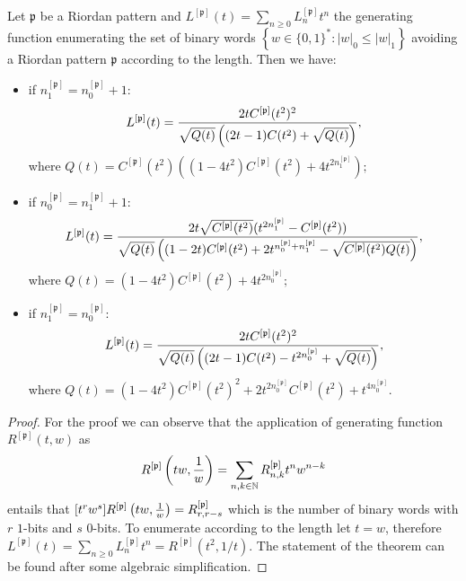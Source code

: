 \begin{teo}
\label{teo3}
Let $\mathfrak{p}$ be  a Riordan pattern and $L^{[\mathfrak{p}]}(t)=\sum_{n\geq
0}L_n^{[\mathfrak{p}]}t^n$ the generating function enumerating the set of binary words $\left\lbrace w\in
\lbrace 0,1 \rbrace^{*}: |w|_0\leq |w|_1\right\rbrace$ avoiding  a Riordan
pattern $\mathfrak{p}$ according to the length. Then we
have:
\begin{itemize}

\item if $n_1^{[\mathfrak{p}]}=n_0^{[\mathfrak{p}]}+1:$
$$L^{[\mathfrak{p}]}(t)= {2tC^{[\mathfrak{p}]}(t^2)^2 \over \sqrt{Q(t)}\left((2t-1)C(t^2)+ \sqrt{ Q(t) } \right)}, $$
where $Q(t)=C^{[\mathfrak{p}]}(t^2)\left( (1-4t^2)C^{[\mathfrak{p}]}(t^2)+4t^{2n_1^{[\mathfrak{p}]}}\right);$

\item if $n_0^{[\mathfrak{p}]}=n_1^{[\mathfrak{p}]}+1:$
$$L^{[\mathfrak{p}]}(t)={2t\sqrt{C^{[\mathfrak{p}]}(t^2)}(t^{2n_1^{[\mathfrak{p}]}}-C^{[\mathfrak{p}]}(t^2))
\over \sqrt{ Q(t) }\left((1-2t)C^{[\mathfrak{p}]}(t^2)+2t^{n_0^{[\mathfrak{p}]} +n_1^{[\mathfrak{p}]}}
- \sqrt{C^{[\mathfrak{p}]}(t^2) Q(t) } \right)}, $$
where $Q(t)=(1-4t^2)C^{[\mathfrak{p}]}(t^2)+4t^{2n_0^{[\mathfrak{p}]}};$

\item if $n_1^{[\mathfrak{p}]}=n_0^{[\mathfrak{p}]}:$ $$L^{[\mathfrak{p}]}(t)=
{2tC^{[\mathfrak{p}]}(t^2)^2 \over \sqrt{ Q(t)
}\left((2t-1)C(t^2)-t^{2n_0^{[\mathfrak{p}]}} + \sqrt{ Q(t) } \right)}, $$
where
$Q(t)=(1-4t^2)C^{[\mathfrak{p}]}(t^2)^2+2t^{2n_0^{[\mathfrak{p}]}}C^{[\mathfrak{p}]}(t^2)+t^{4n_0^{[\mathfrak{p}]}}.$

\end{itemize}
\end{teo}
\begin{proof}
For the proof we can observe that the application of generating function $R^{[\mathfrak{p}]}(t, w)$ as
\begin{displaymath}
 R^{[\mathfrak{p}]}\left(tw,{1 \over w}\right)=\sum_{n,k\in\mathbb{N}} R_{n, k}^{[\mathfrak{p}]}t^n w^{n-k}
\end{displaymath}
entails that $[t^{r}w^{s}]R^{[\mathfrak{p}]}\left(tw,{1 \over w}\right)=R_{r,
r-s}^{[\mathfrak{p}]}$ which is the number of binary words with $r$ $1$-bits
and $s$ $0$-bits.  To enumerate according to the length let $t=w$, therefore
$L^{[\mathfrak{p}]}(t)=\sum_{n\geq
0}L_n^{[\mathfrak{p}]}t^n=R^{[\mathfrak{p}]}(t^2,1/t)$. The statement of the
theorem can be found after some algebraic simplification.
\end{proof}

